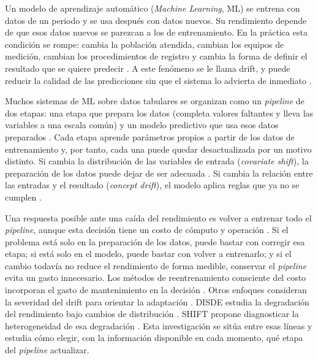 

Un modelo de aprendizaje automático (\textit{Machine Learning}, ML) se entrena con datos de
un periodo y se usa después con datos nuevos. Su rendimiento depende de que esos datos
nuevos se parezcan a los de entrenamiento. En la práctica esta condición se rompe: cambia la
población atendida, cambian los equipos de medición, cambian los procedimientos de registro
y cambia la forma de definir el resultado que se quiere predecir
\cite{morenotorres2012shift}. A este fenómeno se le llama drift, y puede reducir la calidad
de las predicciones sin que el sistema lo advierta de inmediato \cite{gama2014survey}.

Muchos sistemas de ML sobre datos tabulares se organizan como un \textit{pipeline} de dos
etapas: una etapa que prepara los datos (completa valores faltantes y lleva las variables a
una escala común) y un modelo predictivo que usa esos datos preparados
\cite{sculley2015debt}. Cada etapa aprende parámetros propios a partir de los datos de
entrenamiento y, por tanto, cada una puede quedar desactualizada por un motivo distinto.
Si cambia la distribución de las variables de entrada (\textit{covariate shift}), la
preparación de los datos puede dejar de ser adecuada \cite{morenotorres2012shift}. Si cambia
la relación entre las entradas y el resultado (\textit{concept drift}), el modelo aplica
reglas que ya no se cumplen \cite{cai2023disde}.

Una respuesta posible ante una caída del rendimiento es volver a entrenar todo el
\textit{pipeline}, aunque esta decisión tiene un costo de cómputo y operación
\cite{mahadevan2024cost}. Si el problema está solo en la preparación de los datos, puede
bastar con corregir esa etapa; si está solo en el modelo, puede bastar con volver a
entrenarlo; y si el cambio todavía no reduce el rendimiento de forma medible, conservar el
\textit{pipeline} evita un gasto innecesario. Los métodos de reentrenamiento consciente del
costo incorporan el gasto de mantenimiento en la decisión \cite{mahadevan2024cost}. Otros
enfoques consideran la severidad del drift para orientar la adaptación
\cite{shakhovska2025severity}. DISDE estudia la degradación del rendimiento bajo cambios de
distribución \cite{cai2023disde}. SHIFT propone diagnosticar la heterogeneidad de esa
degradación \cite{singh2025shift}. Esta investigación se sitúa entre esas líneas y estudia
cómo elegir, con la información disponible en cada momento, qué etapa del \textit{pipeline}
actualizar.


